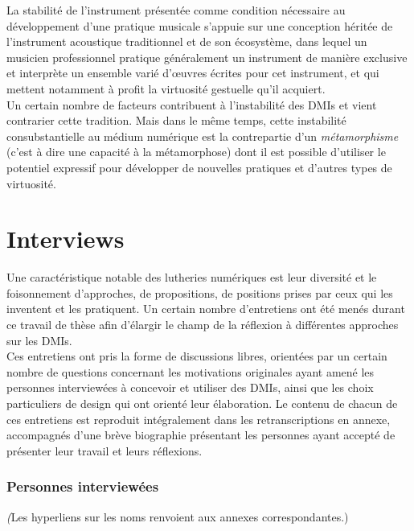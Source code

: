 \noindent La stabilité de l'instrument présentée comme condition nécessaire au développement d'une pratique musicale s'appuie sur une conception héritée de l'instrument acoustique traditionnel et de son écosystème, dans lequel un musicien professionnel pratique généralement un instrument de manière exclusive et interprète un ensemble varié d'œuvres écrites pour cet instrument, et qui mettent notamment à profit la virtuosité gestuelle qu'il acquiert.\\
\indent Un certain nombre de facteurs contribuent à l'instabilité des \glspl{DMI} et vient contrarier cette tradition. Mais dans le même temps, cette instabilité consubstantielle au médium numérique est la contrepartie d'un \textit{métamorphisme} (c'est à dire une capacité à la métamorphose) dont il est possible d'utiliser le potentiel expressif pour développer de nouvelles pratiques et d'autres types de virtuosité.


\section{Interviews}

\noindent Une caractéristique notable des lutheries numériques est leur diversité et le foisonnement d'approches, de propositions, de positions prises par ceux qui les inventent et les pratiquent. Un certain nombre d'entretiens ont été menés durant ce travail de thèse afin d'élargir le champ de la réflexion à différentes approches sur les \glspl{DMI}.\\
\indent Ces entretiens ont pris la forme de discussions libres, orientées par un certain nombre de questions concernant les motivations originales ayant amené les personnes interviewées à concevoir et utiliser des \glspl{DMI}, ainsi que les choix particuliers de design qui ont orienté leur élaboration. Le contenu de chacun de ces entretiens est reproduit intégralement dans les retranscriptions en annexe, accompagnés d'une brève biographie présentant les personnes ayant accepté de présenter leur travail et leurs réflexions.

\subsubsection*{Personnes interviewées}
\noindent \textit(Les hyperliens sur les noms renvoient aux annexes correspondantes.)

